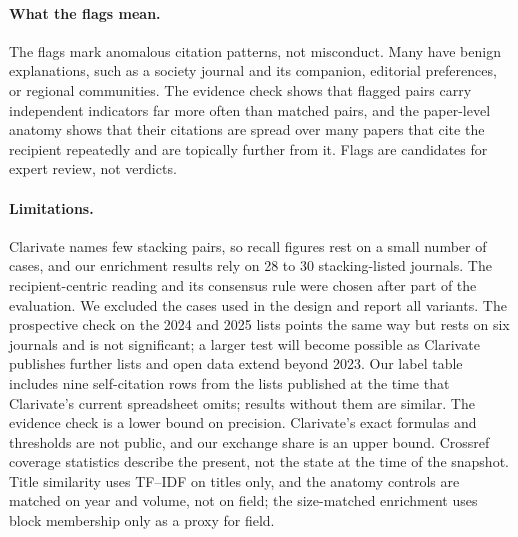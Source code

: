 \paragraph{What the flags mean.}
The flags mark anomalous citation patterns, not misconduct. Many have benign explanations, such as a society journal
and its companion, editorial preferences, or regional communities. The evidence check shows that flagged pairs carry
independent indicators far more often than matched pairs, and the paper-level anatomy shows that their citations are
spread over many papers that cite the recipient repeatedly and are topically further from it. Flags are candidates for
expert review, not verdicts.

\paragraph{Limitations.}
Clarivate names few stacking pairs, so recall figures rest on a small number of cases, and our enrichment results rely
on 28 to 30 stacking-listed journals. The recipient-centric reading and its consensus rule were chosen after part of
the evaluation. We excluded the cases used in the design and report all variants. The prospective check on the 2024
and 2025 lists points the same way but rests on six journals and is not significant; a larger test will become possible
as Clarivate publishes further lists and open data extend beyond 2023. Our label table includes nine self-citation rows
from the lists published at the time that Clarivate's current spreadsheet omits; results without them are similar.
The evidence check is a lower bound on precision. Clarivate's exact formulas and thresholds are not
public, and our exchange share is an upper bound. Crossref coverage statistics describe the present, not the state at
the time of the snapshot. Title similarity uses TF--IDF on titles only, and the anatomy controls are matched on year and volume, not on
field; the size-matched enrichment uses block membership only as a proxy for field.

